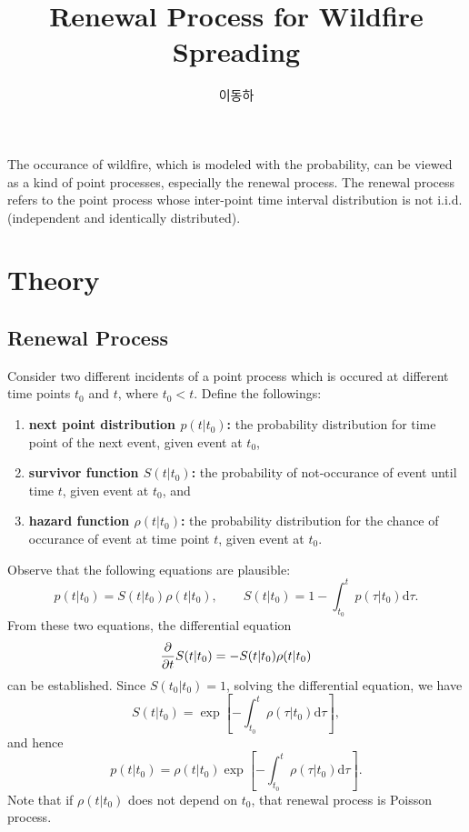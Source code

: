 \documentclass{article}[notitlepage]
\title{Renewal Process for Wildfire Spreading}
\author{이동하}
\date{}
\theoremstyle{definition}
\def \dd{\mathrm d}
\begin{document}
\maketitle
The occurance of wildfire, which is modeled with the probability, can be viewed as a kind of point processes, especially the renewal process. The renewal process refers to the point process whose inter-point time interval distribution is not i.i.d.(independent and identically distributed).

\section{Theory}

\subsection{Renewal Process}
Consider two different incidents of a point process which is occured at different time points $t_0$ and $t$, where $t_0 < t$. Define the followings:
\begin{enumerate}
    \item \textbf{next point distribution $p(t|t_0)$:} the probability distribution for time point of the next event, given event at $t_0$,
    \item \textbf{survivor function $S(t|t_0)$:} the probability of not-occurance of event until time $t$, given event at $t_0$, and
    \item \textbf{hazard function $\rho(t|t_0)$:} the probability distribution for the chance of occurance of event at time point $t$, given event at $t_0$.
\end{enumerate}
Observe that the following equations are plausible:
\[p(t|t_0) = S(t|t_0) \rho(t|t_0), \qquad S(t|t_0) = 1 - \int^{t}_{t_0} p(\tau|t_0) \dd \tau.\]
From these two equations, the differential equation
\[\pdv*{S(t|t_0) }{t} = - S(t|t_0) \rho(t|t_0)\]
can be established. Since $S(t_0|t_0) = 1$, solving the differential equation, we have
\[S(t|t_0) = \exp\left[-\int^t_{t_0} \rho(\tau|t_0) \dd{\tau}\right],\]
and hence
\[p(t|t_0) = \rho(t|t_0) \exp\left[-\int^t_{t_0} \rho(\tau|t_0) \dd{\tau}\right].\]
Note that if $\rho(t|t_0)$ does not depend on $t_0$, that renewal process is Poisson process.
\end{document}
